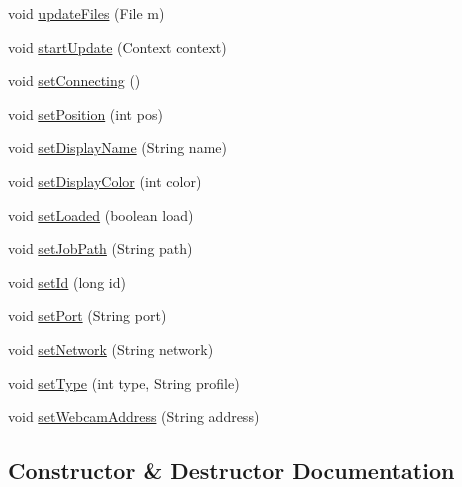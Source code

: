 \begin{DoxyCompactItemize}
\item 
void \hyperlink{classandroid_1_1app_1_1printerapp_1_1model_1_1_model_printer_aa06178c32a4cfc4ff196fa1e8ecc0769}{update\+Files} (File m)
\item 
void \hyperlink{classandroid_1_1app_1_1printerapp_1_1model_1_1_model_printer_a175565339d9f2911b11a5d98d7798cfa}{start\+Update} (Context context)
\item 
void \hyperlink{classandroid_1_1app_1_1printerapp_1_1model_1_1_model_printer_a2a9e6c687d9bf607ac834bda90bde7b3}{set\+Connecting} ()
\item 
void \hyperlink{classandroid_1_1app_1_1printerapp_1_1model_1_1_model_printer_a77d1d19f555a0a0c6f73f057806b5667}{set\+Position} (int pos)
\item 
void \hyperlink{classandroid_1_1app_1_1printerapp_1_1model_1_1_model_printer_a596726ec606def0ccdb9436fa9f139ea}{set\+Display\+Name} (String name)
\item 
void \hyperlink{classandroid_1_1app_1_1printerapp_1_1model_1_1_model_printer_a7d7223a14fc2afd68714ef3c63791e15}{set\+Display\+Color} (int color)
\item 
void \hyperlink{classandroid_1_1app_1_1printerapp_1_1model_1_1_model_printer_a678c5e868c4759df895c59bf683c339a}{set\+Loaded} (boolean load)
\item 
void \hyperlink{classandroid_1_1app_1_1printerapp_1_1model_1_1_model_printer_ad496b744f25eebbdb4629eee95677a0f}{set\+Job\+Path} (String path)
\item 
void \hyperlink{classandroid_1_1app_1_1printerapp_1_1model_1_1_model_printer_ac7cb0343c6fc7e98cb0941d1e92a096d}{set\+Id} (long id)
\item 
void \hyperlink{classandroid_1_1app_1_1printerapp_1_1model_1_1_model_printer_ae83ba4e77b1dc97ced7b60517786a1a4}{set\+Port} (String port)
\item 
void \hyperlink{classandroid_1_1app_1_1printerapp_1_1model_1_1_model_printer_a9be540f55bc970b0246baea1bbfeeff0}{set\+Network} (String network)
\item 
void \hyperlink{classandroid_1_1app_1_1printerapp_1_1model_1_1_model_printer_a994adddce233b32d401b29a63708cd20}{set\+Type} (int type, String profile)
\item 
void \hyperlink{classandroid_1_1app_1_1printerapp_1_1model_1_1_model_printer_a84b02a537707684aff6f12c5b90b8943}{set\+Webcam\+Address} (String address)
\end{DoxyCompactItemize}


\subsection{Constructor \& Destructor Documentation}
\mbox{\label{classandroid_1_1app_1_1printerapp_1_1model_1_1_model_printer_a3fa83e6fe662ccc7aa02fd7085811f6d}} 
